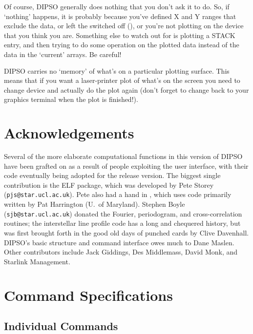 \documentclass[twoside,11pt,noabs,nolof]{starlink}
\begin{document}
Of course, DIPSO generally does nothing that you don't ask it to do.
So, if `nothing' happens, it is probably because you've defined X and
Y ranges that exclude the data, or left the   switched off
(),  or you're not plotting on the device that you think you
are. Something else to watch out for is plotting a STACK entry, and
then trying to do some operation on the plotted data instead of the
data in the `current' arrays. Be careful!

DIPSO carries no `memory' of what's on a particular plotting surface.
This means that if you want a laser-printer plot of what's on the
screen you need to change device and actually do the plot again (don't
forget to change back to your graphics terminal when the plot is
finished!).

\section {Acknowledgements}

Several of the more elaborate computational functions in this version
of DIPSO have been grafted on as a result of people exploiting the user
interface, with their code eventually being adopted for the release
version. The biggest single contribution is the ELF package, which was
developed by Pete Storey ({\texttt{pjs@star.ucl.ac.uk}}).  Pete also had a
hand in ,  which uses code primarily written by Pat Harrington
(U.\ of Maryland). Stephen Boyle ({\texttt{sjb@star.ucl.ac.uk}})  donated the
Fourier, periodogram, and cross-correlation routines; the interstellar
line profile code has a long and chequered history, but was first
brought forth in the good old days of punched cards by Clive
Davenhall. DIPSO's basic structure and command interface owes much to
Dane Maslen. Other contributors include Jack Giddings, Des Middlemass,
David Monk, and Starlink Management.

\newpage
\appendix

\section {\label{APP:FULL}Command Specifications}

\subsection{Individual Commands}
\end{document}
